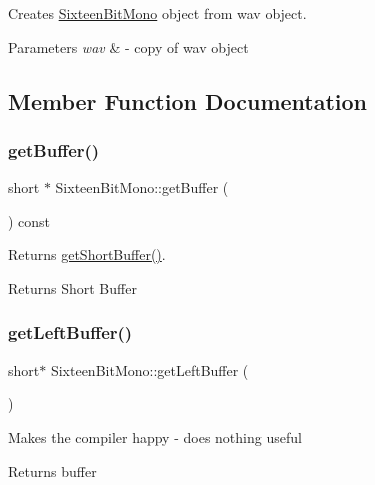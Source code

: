 Creates \hyperlink{classSixteenBitMono}{Sixteen\+Bit\+Mono} object from wav object.


\begin{DoxyParams}{Parameters}
{\em wav} & -\/ copy of wav object \\
\hline
\end{DoxyParams}


\subsection{Member Function Documentation}
\mbox{\label{classSixteenBitMono_ae5ac457f6ab42ee169800d890b676415}} 
\subsubsection{\texorpdfstring{get\+Buffer()}{getBuffer()}}
{\footnotesize\ttfamily short $\ast$ Sixteen\+Bit\+Mono\+::get\+Buffer (\begin{DoxyParamCaption}{ }\end{DoxyParamCaption}) const}

Returns \hyperlink{classWav_a24c23c9823a08c0ff1a2a39427b36135}{get\+Short\+Buffer()}. \begin{DoxyReturn}{Returns}
Short Buffer 
\end{DoxyReturn}
\mbox{\label{classSixteenBitMono_ab739d896964027cfe15433f890138a9e}} 
\subsubsection{\texorpdfstring{get\+Left\+Buffer()}{getLeftBuffer()}}
{\footnotesize\ttfamily short$\ast$ Sixteen\+Bit\+Mono\+::get\+Left\+Buffer (\begin{DoxyParamCaption}{ }\end{DoxyParamCaption})\hspace{0.3cm}{\ttfamily [inline]}}

Makes the compiler happy -\/ does nothing useful

\begin{DoxyReturn}{Returns}
buffer 
\end{DoxyReturn}
\mbox{\label{classSixteenBitMono_a00036b6ac82e19df660679b409767ebb}} 
